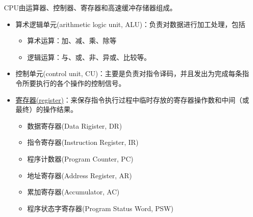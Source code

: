 \begin{frame}
 
CPU由运算器、控制器、寄存器和高速缓冲存储器组成。

\end{frame}

\begin{frame}
\begin{itemize}
\item  算术逻辑单元(arithmetic logic unit, ALU)：负责对数据进行加工处理，包括
\begin{itemize}
\item 算术运算：加、减、乘、除等
\item 逻辑运算：与、或、非、异或、比较等。
\end{itemize} \vspace{.2in}
\item  控制单元(control unit, CU)：主要是负责对指令译码，并且发出为完成每条指令所要执行的各个操作的控制信号。\\[0.2in]
\item  \href{https://blog.csdn.net/kwame211/article/details/77773621}{寄存器(register)}：来保存指令执行过程中临时存放的寄存器操作数和中间（或最终）的操作结果。
  \begin{itemize}
  \item 数据寄存器(Data Rigister, DR)
  \item 指令寄存器(Instruction Register, IR)
  \item 程序计数器(Program Counter, PC)
  \item 地址寄存器(Address Register, AR)
  \item 累加寄存器(Accumulator, AC)
  \item 程序状态字寄存器(Program Status Word, PSW)
  \end{itemize}\vspace{0.2in}

\end{itemize}
\end{frame}
 
